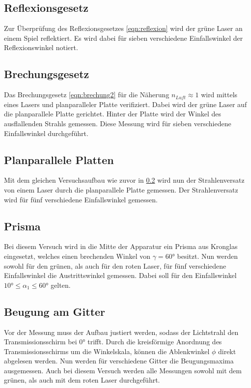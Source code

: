 \subsection{Reflexionsgesetz}
\label{sec:reflexionsmessung}
Zur Überprüfung des Reflexionsgesetzes \ref{eqn:reflexion} wird der grüne Laser an einem Spiel reflektiert. Es wird dabei für 
sieben verschiedene Einfallswinkel der Reflexionswinkel notiert. 

\subsection{Brechungsgesetz}
\label{sec:brechungmessung}
Das Brechungsgesetz \ref{eqn:brechung2} für die Näherung $n_{Luft}\approx1$ wird mittels eines Lasers und planparalleler Platte 
verifiziert. Dabei wird der grüne Laser auf die planparallele Platte gerichtet. Hinter der Platte wird der Winkel des ausflallenden
Strahls gemessen. Diese Messung wird für sieben verschiedene Einfallswinkel durchgeführt.

\subsection{Planparallele Platten}
\label{sec:planplattemessung}
Mit dem gleichen Versuchsaufbau wie zuvor in \ref{sec:brechungmessung} wird nun der Strahlenversatz von einem Laser durch die 
planparallele Platte gemessen. Der Strahlenversatz wird für fünf verschiedene Einfallswinkel gemessen. 

\subsection{Prisma}
\label{sec:prismamessung}
Bei diesem Versuch wird in die Mitte der Apparatur ein Prisma aus Kronglas eingesetzt, welches einen brechenden Winkel von 
$\gamma=60°$ besitzt. Nun werden sowohl für den grünen, als auch für den roten Laser, für fünf verschiedene Einfallswinkel
die Austrittswinkel gemessen. Dabei soll für den Einfallswinkel $10°\leq\alpha_1\leq 60°$ gelten. 

\subsection{Beugung am Gitter}
\label{sec:beugungmessung}
Vor der Messung muss der Aufbau justiert werden, sodass der Lichtstrahl den Transmissionsschirm bei $0°$ trifft. Durch die 
kreisförmige Anordnung des Transmissionsschirms um die Winkelskala, können die Ablenkwinkel $\phi$ direkt abgelesen werden.
Nun werden für verschiedene Gitter die Beugungsmaxima ausgemessen.
Auch bei diesem Versuch werden alle Messungen sowohl mit dem grünen, als auch mit dem roten Laser durchgeführt.